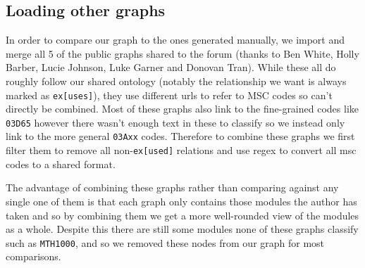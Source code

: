 \documentclass[english, 12pt]{article}
\begin{document}
\subsection{Loading other graphs}
In order to compare our graph to the ones generated manually, we import and merge all 5 of the public graphs shared to the forum (thanks to Ben White, Holly Barber, Lucie Johnson, Luke Garner and Donovan Tran). While these all do roughly follow our shared ontology (notably the relationship we want is always marked as \texttt{ex[uses]}), they use different urls to refer to MSC codes so can't directly be combined. Most of these graphs also link to the fine-grained codes like \texttt{03D65} however there wasn't enough text in these to classify so we instead only link to the more general \texttt{03Axx} codes. Therefore to combine these graphs we first filter them to remove all non-\texttt{ex[used]} relations and use regex to convert all msc codes to a shared format.

The advantage of combining these graphs rather than comparing against any single one of them is that each graph only contains those modules the author has taken and so by combining them we get a more well-rounded view of the modules as a whole. Despite this there are still some modules none of these graphs classify such as \texttt{MTH1000}, and so we removed these nodes from our graph for most comparisons.
\end{document}
